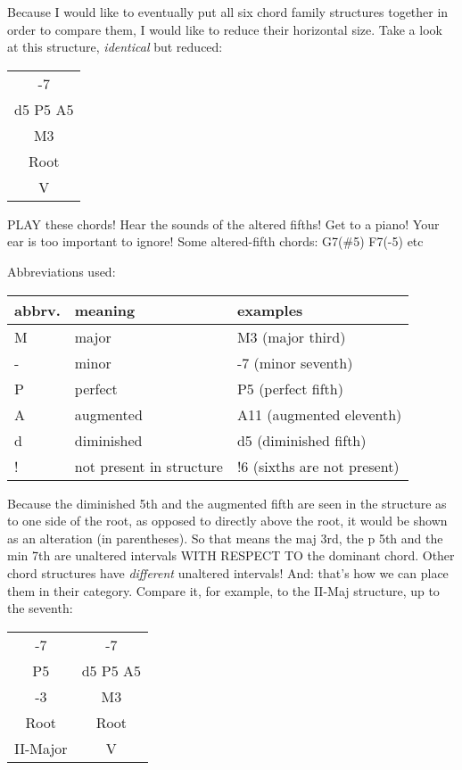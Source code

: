 Because I would like to eventually put all six chord family structures
together in order to compare them, I would like to reduce their horizontal
size. Take a look at this structure, \emph{identical} but reduced:

\begin{center}
\begin{tabular}{ | c | }
  \hline
  -7\\
  d5 P5 A5\\
  M3\\
  Root\\
  \hline
  V\\
  \hline
\end{tabular}
\end{center}

PLAY these chords! Hear the sounds of the altered fifths! Get to a piano! Your
ear is too important to ignore! Some altered-fifth chords: G7(\#5) F7(-5) etc

Abbreviations used:

\begin{center}
\begin{tabular}{ l l l }
  \hline
  abbrv.  & meaning      & examples\\
  \hline
  M       & major        & M3 (major third)\\
  -       & minor        & -7 (minor seventh)\\
  P       & perfect      & P5 (perfect fifth)\\
  A       & augmented    & A11 (augmented eleventh)\\
  d       & diminished   & d5 (diminished fifth)\\
  !       & not present in structure &
      !6 (sixths are not present)\\ %
\end{tabular}
\end{center}

Because the diminished 5th and the augmented fifth are seen in the structure as
to one side of the root, as opposed to directly above the root, it would be 
shown as an alteration (in parentheses). So that means the maj 3rd, the p 5th
and the min 7th are unaltered intervals WITH RESPECT TO the dominant chord.
Other chord structures have \emph{different} unaltered intervals! And: that's how
we can place them in their category. Compare it, for example, to the II-Maj
structure, up to the seventh:

\begin{center}
\begin{tabular}{ | c c | }
	\hline
	-7        & -7\\
	P5        & d5 P5 A5\\
	-3        & M3\\
	Root      & Root\\
	\hline
  II-Major  & V\\
  \hline
\end{tabular}
\end{center}

